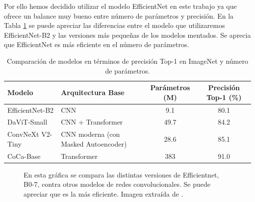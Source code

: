 Por ello hemos decidido utilizar el modelo EfficientNet en este trabajo ya que ofrece un balance muy bueno entre número de parámetros y precisión. En la Tabla \ref{tab:comparacion_modelos_efficientnet} se puede apreciar las diferencias entre el modelo que utilizaremos EfficientNet-B2 y las versiones más pequeñas de los modelos mentados. Se aprecia que EfficientNet es más eficiente en el número de parámetros.

\begin{table}[ht]
\centering
\begin{tabular}{|l|l|c|c|}
\hline
\textbf{Modelo} & \textbf{Arquitectura Base} & \textbf{Parámetros (M)} & \textbf{Precisión Top-1 (\%)} \\
\hline
EfficientNet-B2 & CNN & 9.1 & 80.1 \\
DaViT-Small     & CNN + Transformer & 49.7 & 84.2 \\
ConvNeXt V2-Tiny & CNN moderna (con Masked Autoencoder) & 28.6 & 85.1 \\
CoCa-Base & Transformer & 383 & 91.0 \\
\hline
\end{tabular}
\caption{Comparación de modelos en términos de precisión Top-1 en ImageNet y número de parámetros.}
\label{tab:comparacion_modelos_efficientnet}
\end{table}


\begin{figure}[h]
\noindent
{}
\caption{En esta gráfica se compara las distintas versiones de Efficientnet, B0-7, contra otros modelos de redes convolucionales. Se puede apreciar que es la más eficiente. Imagen extraída de \cite{efficientnet2019}.}
\label{fig:efficientnet_grafica}
\end{figure}



